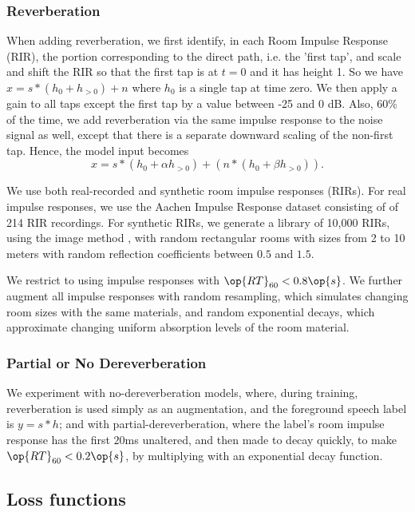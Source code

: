 \documentclass[english]{article}
\begin{document}
\subsubsection{Reverberation} 

When adding reverberation, we first identify, in each  Room Impulse Response (RIR), the portion corresponding to the direct path, i.e. the 'first tap', and scale and shift the RIR so that the first tap is at $t=0$ and it has height 1. So we have $x = s * (h_{0} + h_{>0}) + n$ where $h_0$ is a single tap at time zero. We then apply a gain to all taps except the first tap by a value between -25 and 0 dB. Also, 60\% of the time, we add reverberation via the same impulse response to the noise signal as well, except that there is a separate downward scaling of the non-first tap. Hence, the model input becomes
$$ x = s * ({{h}_{0}} + \alpha h_{>0}) + (n * (h_0 + \beta h_{>0})).$$

We use both real-recorded and synthetic room impulse responses (RIRs). For real impulse responses, we use the Aachen Impulse Response dataset \cite{jeub2009binaural} consisting of of 214 RIR recordings. For synthetic RIRs, we generate a library of 10,000 RIRs, using the image method \cite{allen1979image}, with random rectangular rooms with sizes from 2 to 10 meters with random reflection coefficients between $0.5$ and $1.5$.

We restrict to using impulse responses with $\op{RT}_{60} < 0.8\op{s}$. We further augment all impulse responses with random resampling, which simulates changing room sizes with the same materials, and random exponential decays, which approximate changing uniform absorption levels of the room material. 

\subsubsection{Partial or No Dereverberation} We experiment with no-dereverberation models, where, during training, reverberation is used simply as an augmentation, and the foreground speech label is $y = s * h$; and with partial-dereverberation, where the label's room impulse response has the first $20$ms unaltered, and then made to decay quickly, to make $\op{RT}_{60} < 0.2\op{s}$, by multiplying with an exponential decay function.


\subsection{Loss functions}
\end{document}
